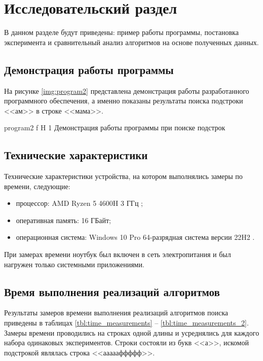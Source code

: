 \chapter{Исследовательский раздел}

В данном разделе будут приведены: пример работы программы, постановка эксперимента и сравнительный анализ алгоритмов на основе полученных данных.

\section{Демонстрация работы программы}


На рисунке \ref{img:program2} представлена демонстрация работы разработанного программного обеспечения, а именно показаны результаты поиска подстроки <<ам>> в строке <<мама>>.  


{program2} %
{f} %
{H} %
{1\textwidth} %
{Демонстрация работы программы при поиске подстрок} %



\section{Технические характеристики}

Технические характеристики устройства, на котором выполнялись замеры по времени, следующие:
\begin{itemize}
	\item процессор: AMD Ryzen 5 4600H 3 ГГц \cite{amd};
	\item оперативная память: 16 ГБайт;
	\item операционная система: Windows 10 Pro 64-разрядная система версии 22H2 \cite{windows}.
\end{itemize}

При замерах времени ноутбук был включен в сеть электропитания и был нагружен только системными приложениями.

\section{Время выполнения реализаций алгоритмов}

Результаты замеров времени выполнения реализаций алгоритмов поиска приведены в таблицах \ref{tbl:time_measurements} -- \ref{tbl:time_measurements_2}.
Замеры времени проводились на строках одной длины и усреднялись для каждого набора одинаковых экспериментов. 
Строки состояли из букв <<а>>, искомой подстрокой являлась строка <<аааааффффф>>.

